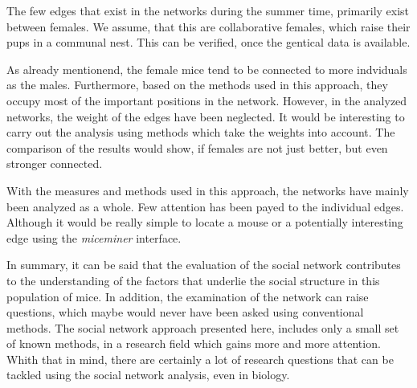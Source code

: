 The few edges that exist in the networks during the summer time, primarily exist between females. We assume, that this are collaborative females, which raise their pups in a communal nest. This can be verified, once the gentical data is available.

As already mentionend, the female mice tend to be connected to more indviduals as the males. Furthermore, based on the methods used in this approach, they occupy most of the important positions in the network. However, in the analyzed networks, the weight of the edges have been neglected. It would be interesting to carry out the analysis using methods which take the weights into account. The comparison of the results would show, if females are not just better, but even stronger connected.

With the measures and methods used in this approach, the networks have mainly been analyzed as a whole. Few attention has been payed to the individual edges. Although it would be really simple to locate a mouse or a potentially interesting edge using the \textit{miceminer} interface.

In summary, it can be said that the evaluation of the social network contributes to the understanding of the factors that underlie the social structure in this population of mice. In addition, the examination of the network can raise questions, which maybe would never have been asked using conventional methods. The social network approach presented here, includes only a small set of known methods, in a research field which gains more and more attention. Whith that in mind, there are certainly a lot of research questions that can be tackled using the social network analysis, even in biology.
   




